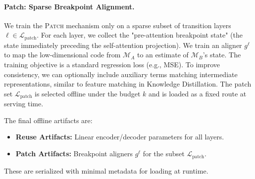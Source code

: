 \documentclass{article}
\theoremstyle{plain}
\theoremstyle{definition}
\theoremstyle{remark}
\begin{document}
\paragraph{Patch: Sparse Breakpoint Alignment.}
We train the \textsc{Patch} mechanism only on a sparse subset of transition layers $\ell \in \mathcal{L}_{\text{patch}}$. For each layer, we collect the "pre-attention breakpoint state" (the state immediately preceding the self-attention projection). We train an aligner $g^\ell$ to map the low-dimensional code from $\mathcal{M}_A$ to an estimate of $\mathcal{M}_B$'s state.
The training objective is a standard regression loss (e.g., MSE). To improve consistency, we can optionally include auxiliary terms matching intermediate representations, similar to feature matching in Knowledge Distillation.
The patch set $\mathcal{L}_{\text{patch}}$ is selected offline under the budget $k$ and is loaded as a fixed route at serving time.

The final offline artifacts are:
\begin{itemize}
    \setlength{\itemsep}{1pt}
    \setlength{\parskip}{0pt}
    \setlength{\topsep}{2pt}
    \item \textbf{Reuse Artifacts:} Linear encoder/decoder parameters for all layers.
    \item \textbf{Patch Artifacts:} Breakpoint aligners $g^\ell$ for the subset $\mathcal{L}_{\text{patch}}$.
\end{itemize}
These are serialized with minimal metadata for loading at runtime.
\end{document}
